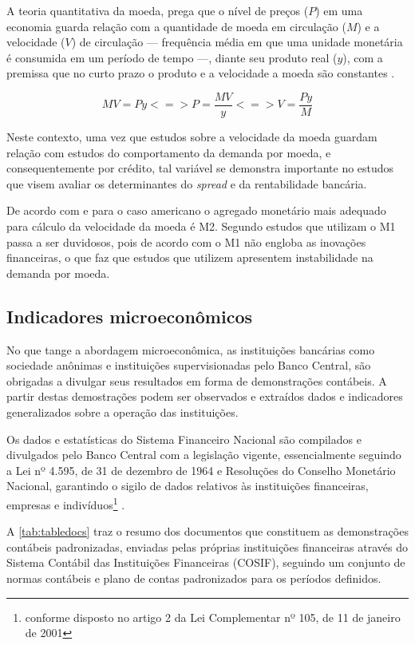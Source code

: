 \documentclass[
  12pt,
  12pt,
  openright,
  oneside,
  a4paper,
  chapter=TITLE,
  section=TITLE,
  subsection=TITLE,
  subsubsection=TITLE,
  english,
  portugues,
  sumario=tradicional]{abntex2}
\begin{document}
A teoria quantitativa da moeda, prega que o nível de preços (\(P\)) em uma economia guarda relação com a quantidade de moeda em circulação (\(M\)) e a velocidade (\(V\)) de circulação --- frequência média em que uma unidade monetária é consumida em um período de tempo ---, diante seu produto real (\(y\)), com a premissa que no curto prazo o produto e a velocidade a moeda são constantes \cite{vasconcellos:2011, vieira:2016}.

\begin{equation}
MV = Py <=> P = \frac{MV}{y} <=> V = \frac{Py}{M}
\end{equation}

Neste contexto, uma vez que estudos sobre a velocidade da moeda guardam relação com estudos do comportamento da demanda por moeda, e consequentemente por crédito, tal variável se demonstra importante no estudos que visem avaliar os determinantes do \emph{spread} e da rentabilidade bancária.

De acordo com \textcite{bordo:1997} e \textcite{hafer:1991} para o caso americano o agregado monetário mais adequado para cálculo da velocidade da moeda é M2. Segundo \textcite{miller:1991} estudos que utilizam o M1 passa a ser duvidosos, pois de acordo com \textcite{baba:1992} o M1 não engloba as inovações financeiras, o que faz que estudos que utilizem apresentem instabilidade na demanda por moeda.

\subsection{Indicadores microeconômicos}

No que tange a abordagem microeconômica, as instituições bancárias como sociedade anônimas e instituições supervisionadas pelo Banco Central, são obrigadas a divulgar seus resultados em forma de demonstrações contábeis. A partir destas demostrações podem ser observados e extraídos dados e indicadores generalizados sobre a operação das instituições.

Os dados e estatísticas do Sistema Financeiro Nacional são compilados e divulgados pelo Banco Central com a legislação vigente, essencialmente seguindo a Lei nº 4.595, de 31 de dezembro de 1964 e Resoluções do Conselho Monetário Nacional, garantindo o sigilo de dados relativos às instituições financeiras, empresas e indivíduos\footnote{conforme disposto no artigo 2 da Lei Complementar nº 105, de 11 de janeiro de 2001} \cite{sgs:bm}.

A \autoref{tab:tabledocs} traz o resumo dos documentos que constituem as demonstrações contábeis padronizadas, enviadas pelas próprias instituições financeiras através do Sistema Contábil das Instituições Financeiras (COSIF), seguindo um conjunto de normas contábeis e plano de contas padronizados para os períodos definidos.
\end{document}
